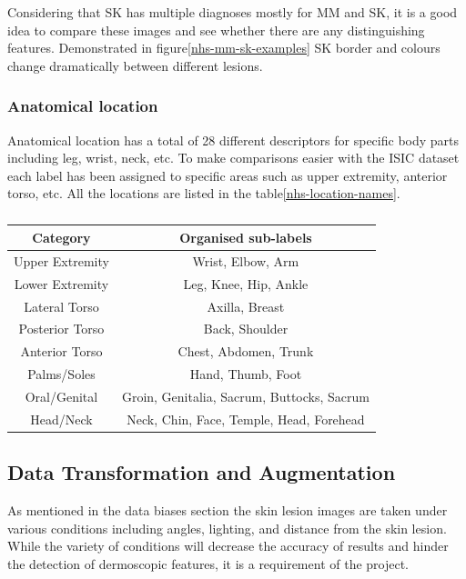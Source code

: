 Considering that SK has multiple diagnoses mostly for MM and SK, it is a good idea to compare these images and see whether there are any distinguishing features. Demonstrated in figure\ref{nhs-mm-sk-examples} SK border and colours change dramatically between different lesions.

\subsubsection{Anatomical location}

Anatomical location has a total of 28 different descriptors for specific body parts including leg, wrist, neck, etc. To make comparisons easier with the ISIC dataset each label has been assigned to specific areas such as upper extremity, anterior torso, etc. All the locations are listed in the table\ref{nhs-location-names}. 


\begin{table}
    \centering
    \begin{tabular}{|c|c|}
        \hline
        Category & Organised sub-labels
        \\
        \hline
        Upper Extremity & Wrist, Elbow, Arm
        \\
        \hline
        Lower Extremity & Leg, Knee, Hip, Ankle
        \\
        \hline
        Lateral Torso & Axilla, Breast
        \\
        \hline
        Posterior Torso & Back, Shoulder
        \\
        \hline
        Anterior Torso & Chest, Abdomen, Trunk
        \\
        \hline
        Palms/Soles & Hand, Thumb, Foot
        \\
        \hline
        Oral/Genital & Groin, Genitalia, Sacrum, Buttocks, Sacrum
        \\
        \hline
        Head/Neck & Neck, Chin, Face, Temple, Head, Forehead
        \\
        \hline
    \end{tabular}
    \caption{}
\end{table} \label{nhs-location-names}



\subsection{Data Transformation and Augmentation}
As mentioned in the data biases section the skin lesion images are taken under various conditions including angles, lighting, and distance from the skin lesion. While the variety of conditions will decrease the accuracy of results and hinder the detection of dermoscopic features, it is a requirement of the project.

